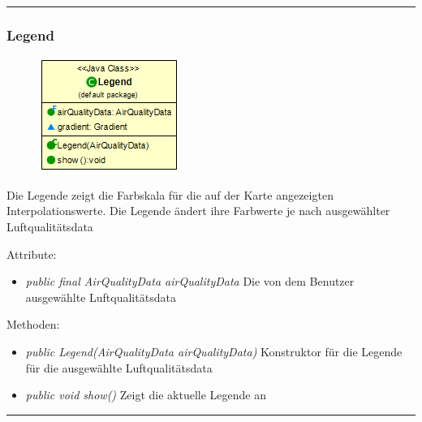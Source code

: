 \rule{\textwidth}{0.4pt}
\subsubsection{Legend}
\begin{minipage}{0.3\textwidth}
    \begin{figure}[H]
        {\centering\includegraphics[scale = 0.5
        ]{media/view/map/Legend_Class.png}}
    \end{figure}
    \end{minipage} \hfill
    \begin{minipage}{0.6\textwidth}
Die Legende zeigt die Farbskala für die auf der Karte angezeigten Interpolationswerte. Die Legende ändert ihre Farbwerte je nach ausgewählter Luftqualitätsdata
\end{minipage}
\vspace{\baselineskip}
Attribute: \begin{itemize} [noitemsep]
     \item \emph{public final AirQualityData airQualityData} Die von dem Benutzer ausgewählte Luftqualitätsdata
\end{itemize}
Methoden: \begin{itemize} [noitemsep]
    \item \emph{public Legend(AirQualityData airQualityData)} Konstruktor für die Legende für die ausgewählte Luftqualitätsdata
    \item \emph{public void show()} Zeigt die aktuelle Legende an
\end{itemize}

\rule{\textwidth}{0.4pt}
